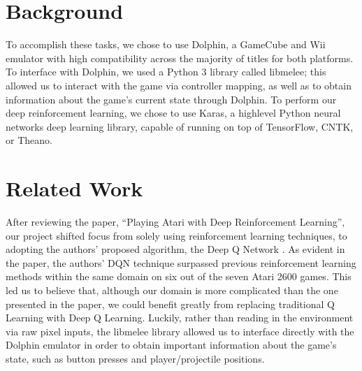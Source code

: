 \documentclass{article}
\begin{document}
\section{Background}
To accomplish these tasks, we chose to use Dolphin, a GameCube and Wii emulator with high compatibility across the majority of titles 
for both platforms. To interface with Dolphin, we used a Python 3 library called libmelee; this allowed us to interact with the game 
via controller mapping, as well as to obtain information about the game’s current state through Dolphin. To perform our deep reinforcement 
learning, we chose to use Karas, a high\-level Python neural networks deep learning library, capable of running on top of TensorFlow, CNTK, or Theano.
\section{Related Work}
After reviewing the paper, “Playing Atari with Deep Reinforcement Learning”, our project shifted focus from solely using reinforcement learning 
techniques, to adopting the authors’ proposed algorithm, the Deep Q Network \cite{atari}. As evident in the paper, the authors’ DQN technique surpassed 
previous reinforcement learning methods within the same domain on six out of the seven Atari 2600 games. This led us to believe that, although 
our domain is more complicated than the one presented in the paper, we could benefit greatly from replacing traditional Q Learning with Deep Q Learning. 
Luckily, rather than reading in the environment via raw pixel inputs, the libmelee library allowed us to interface directly with the Dolphin emulator 
in order to obtain important information about the game’s state, such as button presses and player/projectile positions.
\end{document}
